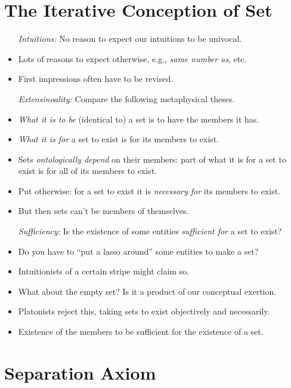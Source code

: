 \documentclass[a4paper, 11pt]{article} %
\begin{document}
\section*{The Iterative Conception of Set}

  \begin{itemize}
    \item[\it Intuitions:] No reason to expect our intuitions to be univocal.
      \item Lots of reasons to expect otherwise, e.g., \textit{same number as}, etc.
      \item First impressions often have to be revised.
    \item[\it Extensinoality:] Compare the following metaphysical theses.
      \item \textit{What it is to be} (identical to) a set is to have the members it has.
      \item \textit{What it is for} a set to exist is for its members to exist.
      \item Sets \textit{ontologically depend} on their members: part of what it is for a set to exist is for all of its members to exist.
      \item Put otherwise: for a set to exist it is \textit{necessary for} its members to exist.
      \item But then sets can't be members of themselves.
    \item[\it Sufficiency:] Is the existence of some entities \textit{sufficient for} a set to exist?
      \item Do you have to ``put a lasso around'' some entities to make a set?
      \item Intuitionists of a certain stripe might claim so.
      \item What about the empty set? Is it a product of our conceptual exertion.
      \item Platonists reject this, taking sets to exist objectively and necessarily.
      \item Existence of the members to be sufficient for the existence of a set.
  \end{itemize}




\section*{Separation Axiom}
\end{document}
